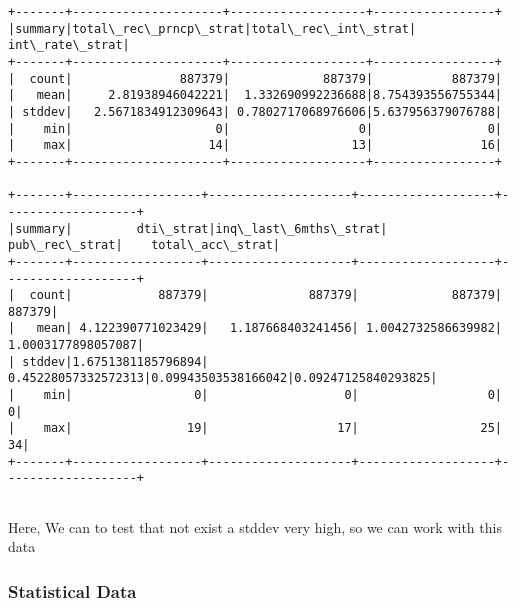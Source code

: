 \documentclass[11pt]{article}
\begin{document}
\begin{Verbatim}[commandchars=\\\{\}]
+-------+---------------------+-------------------+-----------------+
|summary|total\_rec\_prncp\_strat|total\_rec\_int\_strat|   int\_rate\_strat|
+-------+---------------------+-------------------+-----------------+
|  count|               887379|             887379|           887379|
|   mean|     2.81938946042221|  1.332690992236688|8.754393556755344|
| stddev|   2.5671834912309643| 0.7802717068976606|5.637956379076788|
|    min|                    0|                  0|                0|
|    max|                   14|                 13|               16|
+-------+---------------------+-------------------+-----------------+

+-------+------------------+--------------------+-------------------+-------------------+
|summary|         dti\_strat|inq\_last\_6mths\_strat|      pub\_rec\_strat|    total\_acc\_strat|
+-------+------------------+--------------------+-------------------+-------------------+
|  count|            887379|              887379|             887379|             887379|
|   mean| 4.122390771023429|   1.187668403241456| 1.0042732586639982| 1.0003177898057087|
| stddev|1.6751381185796894| 0.45228057332572313|0.09943503538166042|0.09247125840293825|
|    min|                 0|                   0|                  0|                  0|
|    max|                19|                  17|                 25|                 34|
+-------+------------------+--------------------+-------------------+-------------------+


    \end{Verbatim}

    Here, We can to test that not exist a stddev very high, so we can work
with this data

    \hypertarget{statistical-data}{%
\subsubsection{Statistical Data}\label{statistical-data}}
\end{document}
